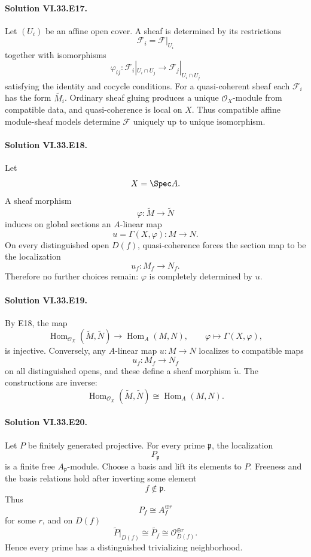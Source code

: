 \paragraph{Solution VI.33.E17.}
Let \((U_i)\) be an affine open cover.  A sheaf is determined by its restrictions
\[
\mathcal F_i=\mathcal F|_{U_i}
\]
together with isomorphisms
\[
\varphi_{ij}:\mathcal F_i|_{U_i\cap U_j}
\longrightarrow
\mathcal F_j|_{U_i\cap U_j}
\]
satisfying the identity and cocycle conditions.  For a quasi-coherent sheaf each \(\mathcal F_i\) has the form
\(\widetilde{M_i}\). Ordinary sheaf gluing produces a unique \(\mathcal O_X\)-module from compatible data, and
quasi-coherence is local on \(X\). Thus compatible affine module-sheaf models determine \(\mathcal F\) uniquely up
to unique isomorphism.

\paragraph{Solution VI.33.E18.}
Let
\[
X=\Spec A.
\]
A sheaf morphism
\[
\varphi:\widetilde M\to\widetilde N
\]
induces on global sections an \(A\)-linear map
\[
u=\Gamma(X,\varphi):M\to N.
\]
On every distinguished open \(D(f)\), quasi-coherence forces the section map to be the localization
\[
u_f:M_f\to N_f.
\]
Therefore no further choices remain: \(\varphi\) is completely determined by \(u\).

\paragraph{Solution VI.33.E19.}
By E18, the map
\[
\operatorname{Hom}_{\mathcal O_X}(\widetilde M,\widetilde N)
\longrightarrow
\operatorname{Hom}_A(M,N),
\qquad
\varphi\mapsto\Gamma(X,\varphi),
\]
is injective. Conversely, any \(A\)-linear map \(u:M\to N\) localizes to compatible maps
\[
u_f:M_f\to N_f
\]
on all distinguished opens, and these define a sheaf morphism \(\widetilde u\). The constructions are inverse:
\[
\boxed{
\operatorname{Hom}_{\mathcal O_X}(\widetilde M,\widetilde N)
\cong
\operatorname{Hom}_A(M,N).
}
\]

\paragraph{Solution VI.33.E20.}
Let \(P\) be finitely generated projective. For every prime \(\mathfrak p\), the localization
\[
P_{\mathfrak p}
\]
is a finite free \(A_{\mathfrak p}\)-module. Choose a basis and lift its elements to \(P\).  Freeness and the basis
relations hold after inverting some element
\[
f\notin\mathfrak p.
\]
Thus
\[
P_f\cong A_f^{\oplus r}
\]
for some \(r\), and on \(D(f)\)
\[
\widetilde P|_{D(f)}
\cong
\widetilde{P_f}
\cong
\mathcal O_{D(f)}^{\oplus r}.
\]
Hence every prime has a distinguished trivializing neighborhood.

